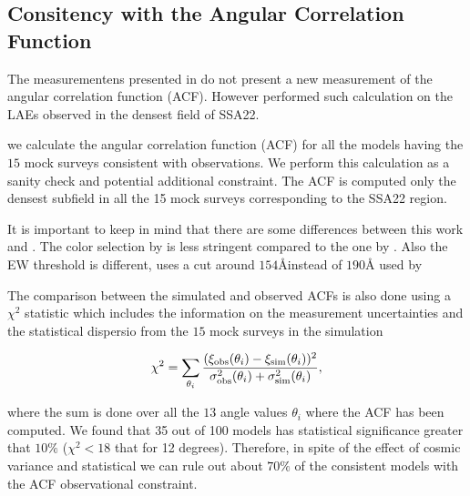 \documentclass[usenatbib]{mn2e}
\begin{document}
\subsection{Consitency with the Angular Correlation Function}

The measurementens presented in \citep{Yamada2012} do not present a
new measurement of the angular correlation function (ACF). However
\citep{Hayashino2004} performed such calculation on the LAEs observed
in the densest field of SSA22.  

we calculate the angular correlation function
(ACF) for all the models having the $15$ mock surveys consistent with
observations. We perform this calculation as a sanity check and
potential additional constraint. The ACF is computed only the densest
subfield in all the 15 mock surveys corresponding to the SSA22
region. 


It is important to keep in mind that there are some differences
between this work and \citep{Yamada2012}. The color selection by
\cite{Yamada2012} is less stringent compared to the one by
\cite{Hayashino2004}. Also the EW threshold is different,
\cite{Hayashino2004} uses a cut around $154$\AA instead of $190$\AA
used by \citep{Yamada2012}

The comparison between the simulated and observed ACFs is also done using a
$\chi^2$ statistic which includes the information on the measurement
uncertainties and the statistical dispersio from the $15$ mock surveys
in the simulation

\begin{equation}
\chi^{2} = \sum_{\theta_i} \frac{(\xi_{\rm obs}(\theta_i) - \xi_{\rm
    sim}(\theta_i))^2}{\sigma_{\rm obs}^2(\theta_i) + \sigma_{\rm
    sim}^2({\theta_i})}, 
\end{equation}

where the sum is done over all the $13$ angle values $\theta_i$ where the
ACF has been computed. We found that 35 out of 100 models  has statistical significance 
greater that $10\%$ ($\chi^{2}<18$ that for 12 degrees). Therefore, 
in spite of the effect of cosmic variance and statistical we can rule out about
$70\%$ of the consistent models with the ACF observational constraint. 







\end{document}
